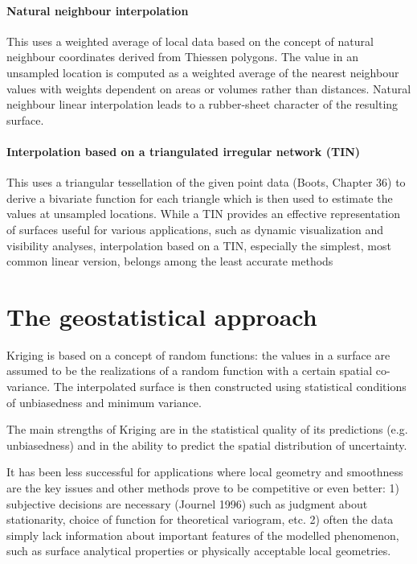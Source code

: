 \documentclass{article}
\begin{document}
\paragraph{Natural neighbour interpolation}
This uses a weighted average of local data based on the concept of natural neighbour coordinates derived from Thiessen polygons. The value in an unsampled location is computed as a weighted average of the nearest neighbour values with weights dependent on areas or volumes rather than distances. Natural neighbour linear interpolation leads to a rubber-sheet character of the resulting surface.

\paragraph{Interpolation based on a triangulated irregular network (TIN)}
This uses a triangular tessellation of the given point data (Boots, Chapter 36) to derive a bivariate function for each triangle which is then used to estimate the values at unsampled locations. While a TIN provides an effective representation of surfaces useful for various applications, such as dynamic visualization and visibility analyses, interpolation based on a TIN, especially the simplest, most common linear version, belongs among the least accurate methods 

\section{The geostatistical approach}
Kriging is based on a concept of random functions: the values in a surface are assumed to be the realizations of a random function with a certain spatial co-variance. The interpolated surface is then constructed using statistical conditions of unbiasedness and minimum variance. 

The main strengths of Kriging are in the statistical quality of its predictions (e.g. unbiasedness) and in the ability to predict the spatial distribution of uncertainty. 

It has been less successful for applications where local geometry and smoothness are the key issues and other methods prove to be competitive or even better: 1) subjective decisions are necessary (Journel 1996) such as judgment about stationarity, choice of function for theoretical variogram, etc. 2) often the data simply lack information about important features of the modelled phenomenon, such as surface analytical properties or physically acceptable local geometries. 
\end{document}
